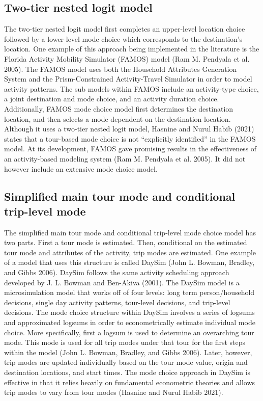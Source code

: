 \documentclass[12pt, oneside, openright]{byuthesis}
\begin{document}
\hypertarget{lit32}{%
\subsection{Two-tier nested logit model}\label{lit32}}

The two-tier nested logit model first completes an upper-level location choice followed by a lower-level mode choice which corresponds to the destination's location. One example of this approach being implemented in the literature is the Florida Activity Mobility Simulator (FAMOS) model (Ram M. Pendyala et al. 2005). The FAMOS model uses both the Household Attributes Generation System and the Prism-Constrained Activity-Travel Simulator in order to model activity patterns. The sub models within FAMOS include an activity-type choice, a joint destination and mode choice, and an activity duration choice. Additionally, FAMOS mode choice model first determines the destination location, and then selects a mode dependent on the destination location. Although it uses a two-tier nested logit model, Hasnine and Nurul Habib (2021) states that a tour-based mode choice is not ``explicitly identified'' in the FAMOS model. At its development, FAMOS gave promising results in the effectiveness of an activity-based modeling system (Ram M. Pendyala et al. 2005). It did not however include an extensive mode choice model.

\hypertarget{lit33}{%
\subsection{Simplified main tour mode and conditional trip-level mode}\label{lit33}}

The simplified main tour mode and conditional trip-level mode choice model has two parts. First a tour mode is estimated. Then, conditional on the estimated tour mode and attributes of the activity, trip modes are estimated. One example of a model that uses this structure is called DaySim (John L. Bowman, Bradley, and Gibbs 2006). DaySim follows the same activity scheduling approach developed by J. L. Bowman and Ben-Akiva (2001). The DaySim model is a microsimulation model that works off of four levels: long term person/household decisions, single day activity patterns, tour-level decisions, and trip-level decisions. The mode choice structure within DaySim involves a series of logsums and approximated logsums in order to econometrically estimate individual mode choice. More specifically, first a logsum is used to determine an overarching tour mode. This mode is used for all trip modes under that tour for the first steps within the model (John L. Bowman, Bradley, and Gibbs 2006). Later, however, trip modes are updated individually based on the tour mode value, origin and destination locations, and start times. The mode choice approach in DaySim is effective in that it relies heavily on fundamental econometric theories and allows trip modes to vary from tour modes (Hasnine and Nurul Habib 2021).
\end{document}
